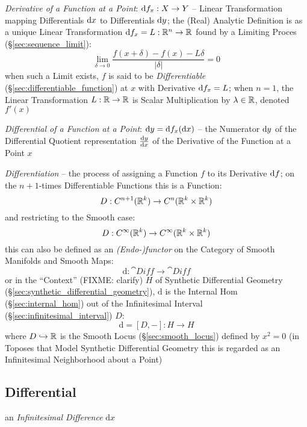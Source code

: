 \emph{Derivative of a Function at a Point}: $\mathrm{d}f_x : X \rightarrow Y$ --
Linear Transformation mapping Differentials $\mathrm{d}x$ to Differentials
$\mathrm{d}y$; the (Real) Analytic Definition is as a unique Linear Transformation
$\mathrm{d}f_x = L : \mathbb{R}^n \rightarrow \mathbb{R}$ found by a Limiting Proces
(\S\ref{sec:sequence_limit}):
\[
  \lim_{\delta\rightarrow0} \frac{f(x + \delta) - f(x) - L\delta}{|\delta|} = 0
\]
when such a Limit exists, $f$ is said to be \emph{Differentiable}
(\S\ref{sec:differentiable_function}) at $x$ with Derivative $\mathrm{d}f_x = L$;
when $n=1$, the Linear Transformation $L : \mathbb{R} \rightarrow \mathbb{R}$ is Scalar
Multiplication by $\lambda \in \mathbb{R}$, denoted $f'(x)$

\emph{Differential of a Function at a Point}:
$\mathrm{d}y = \mathrm{d}f_x(\mathrm{d}x)$ -- the Numerator $\mathrm{d}y$ of the
Differential Quotient representation $\frac{\mathrm{d}y}{\mathrm{d}x}$ of the Derivative of the
Function at a Point $x$

\emph{Differentiation} -- the process of assigning a Function $f$ to its
Derivative $\mathrm{d}f$; on the $n+1$-times Differentiable Functions this is a
Function:
\[
  D : C^{n+1}(\mathbb{R}^k) \rightarrow C^n(\mathbb{R}^k \times \mathbb{R}^k)
\]
and restricting to the Smooth case:
\[
  D : C^\infty(\mathbb{R}^k) \rightarrow C^\infty(\mathbb{R}^k \times \mathbb{R}^k)
\]
this can also be defined as an \emph{(Endo-)functor} on the Category of Smooth
Manifolds and Smooth Maps:
\[
  \mathrm{d} : \cat{Diff} \rightarrow \cat{Diff}
\]
or in the ``Context'' (FIXME: clarify) $H$ of Synthetic Differential Geometry
(\S\ref{sec:synthetic_differential_geometry}), $\mathrm{d}$ is the Internal Hom
(\S\ref{sec:internal_hom}) out of the Infinitesimal Interval
(\S\ref{sec:infinitesimal_interval}) $D$:
\[
  \mathrm{d} = [D,-] : H \rightarrow H
\]
where $D \hookrightarrow \mathbb{R}$ is the Smooth Locus (\S\ref{sec:smooth_locus})
defined by $x^2 = 0$ (in Toposes that Model Synthetic Differential Geometry this
is regarded as an Infinitesimal Neighborhood about a Point)



\subsection{Differential}\label{sec:differential}

an \emph{Infinitesimal Difference} $\mathrm{d}x$

